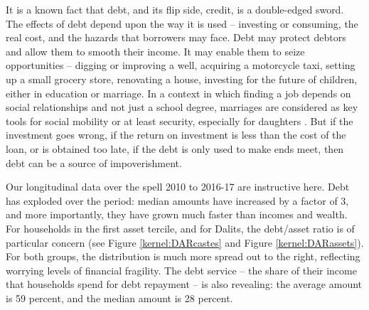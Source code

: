 \documentclass[a4paper, 11pt, onecolumn]{article}
\begin{document}
It is a known fact that debt, and its flip side, credit, is a double-edged sword. The effects of debt depend upon the way it is used – investing or consuming, the real cost, and the hazards that borrowers may face. Debt may protect debtors and allow them to smooth their income. It may enable them to seize opportunities – digging or improving a well, acquiring a motorcycle taxi, setting up a small grocery store, renovating a house, investing for the future of children, either in education or marriage. In a context in which finding a job depends on social relationships and not just a school degree, marriages are considered as key tools for social mobility or at least security, especially for daughters \citep{DeNeve2016}. But if the investment goes wrong, if the return on investment is less than the cost of the loan, or is obtained too late, if the debt is only used to make ends meet, then debt can be a source of impoverishment. 

Our longitudinal data over the spell 2010 to 2016-17 are instructive here. Debt has exploded over the period: median amounts have increased by a factor of 3, and more importantly, they have grown much faster than incomes and wealth. For households in the first asset tercile, and for Dalits, the debt/asset ratio is of particular concern (see Figure \ref{kernel:DARcastes} and Figure \ref{kernel:DARassets}). For both groups, the distribution is much more spread out to the right, reflecting worrying levels of financial fragility. The debt service – the share of their income that households spend for debt repayment – is also revealing: the average amount is 59 percent, and the median amount is 28 percent. 
\end{document}
